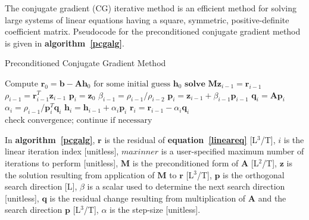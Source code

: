\documentclass[12pt]{article}
\begin{document}
The conjugate gradient (CG) iterative method is an efficient method for solving large systems of linear equations having a square, symmetric, positive-definite coefficient matrix. Pseudocode for the preconditioned conjugate gradient method is given in \textbf{algorithm~\ref{pcgalg}}. 

\begin{algorithm}
\caption{Preconditioned Conjugate Gradient Method}
\label{pcgalg}
\begin{algorithmic}[1]
	\State $\text{Compute } \mathbf{r}_{0} = \mathbf{b - Ah}_{0} \text{ for some initial guess } \mathbf{h}_{0}$
		\State $\textbf{solve } \mathbf{Mz}_{i-1} = \mathbf{r}_{i-1}$ 
		\State $\rho_{i-1} = \mathbf{r}^T_{i-1} \mathbf{z}_{i-1}$
			\State $\mathbf{p}_i = \mathbf{z}_0$
		\Else
			\State $\beta_{i-1} = \rho_{i-1} / \rho_{i-2}$
			\State $\mathbf{p}_i = \mathbf{z}_{i-1} + \beta_{i-1} \mathbf{p}_{i-1}$
		\EndIf
		\State $\mathbf{q}_i = \mathbf{Ap}_{i}$
		\State $\alpha_i = \rho_{i-1} / \mathbf{p}^T_i \mathbf{q}_{i}$ 
		\State $\mathbf{h}_i = \mathbf{h}_{i-1} + \alpha_i \mathbf{p}_{i}$  
		\State $\mathbf{r}_i = \mathbf{r}_{i-1} - \alpha_i \mathbf{q}_{i}$ 
		\State $\text{check convergence; continue if necessary}$
	\EndFor
\end{algorithmic}
\end{algorithm}

In \textbf{algorithm~\ref{pcgalg}}, $\mathbf{r}$ is the residual of \textbf{equation~\ref{lineareq}} [L$^3$/T], $i$ is the linear iteration index [unitless], $maxinner$ is a user-specified maximum number of iterations to perform [unitless], $\mathbf{M}$ is the preconditioned form of $\mathbf{A}$ [L$^2$/T], $\mathbf{z}$ is the solution resulting from application of $\mathbf{M}$ to $\mathbf{r}$ [L$^3$/T], $\mathbf{p}$ is the orthogonal search direction [L], $\beta$ is a scalar used to determine the next search direction [unitless], $\mathbf{q}$ is the residual change resulting from multiplication of $\mathbf{A}$ and the search direction $\mathbf{p}$ [L$^3$/T], $\alpha$ is the step-size [unitless]. 
\end{document}
